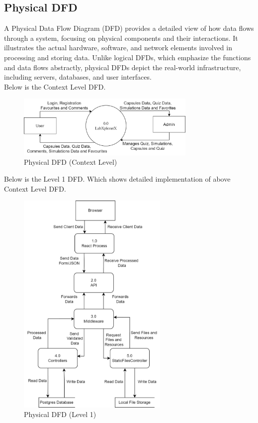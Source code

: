 \newpage
\subsection{Physical DFD}
A Physical Data Flow Diagram (DFD) provides a detailed view of how data flows through a system, focusing on physical components and their interactions. It illustrates the actual hardware, software, and network elements involved in processing and storing data. Unlike logical DFDs, which emphasize the functions and data flows abstractly, physical DFDs depict the real-world infrastructure, including servers, databases, and user interfaces.\\
Below is the Context Level DFD. 
\begin{figure}[H]
    \centering
    \includegraphics[height = 3cm]{Diagrams/physical0.png}
    \caption{Physical DFD (Context Level)}
\end{figure}
Below is the Level 1 DFD. Which shows detailed implementation of above Context Level DFD.
\begin{figure}[H]
    \centering
    \includegraphics[height = 11cm]{Diagrams/physical1.png}
    \caption{Physical DFD (Level 1)}
\end{figure}
